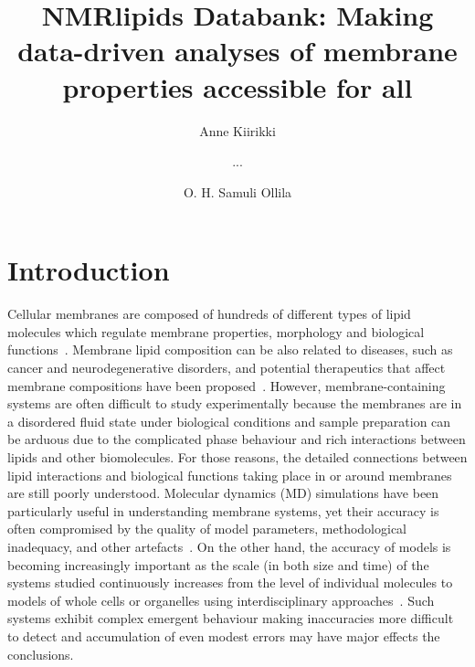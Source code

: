 \documentclass[fleqn,10pt]{wlscirep}
\title{NMRlipids Databank: Making data-driven analyses of membrane properties accessible for all}
\author[1]{Anne Kiirikki}
\author[2]{...}
\author[1,*]{O. H. Samuli Ollila}
\affil[1]{University of Helsinki, Institute of Biotechonology, Helsinki, Finland}
\affil[2]{Affiliation, department, city, postcode, country}
\affil[*]{samuli.ollila@helsinki.fi}
\begin{document}
\flushbottom
\maketitle
%
%
\thispagestyle{empty}


\section{Introduction}


Cellular membranes are composed of hundreds of different types of lipid molecules which regulate membrane properties, morphology and biological functions~\cite{vanmeer08}. Membrane lipid composition can be also related to diseases, such as cancer and neurodegenerative disorders, and potential therapeutics that affect membrane compositions have been proposed~\cite{torres21}. However, membrane-containing systems are often difficult to study experimentally because the membranes are in a disordered fluid state under biological conditions and sample preparation can be arduous due to the complicated phase behaviour and rich interactions between lipids and other biomolecules. For those reasons, the detailed connections between lipid interactions and biological functions taking place in or around membranes are still poorly understood.
Molecular dynamics (MD) simulations have been particularly useful in understanding membrane systems, yet their accuracy is often compromised by the quality of model parameters, methodological inadequacy, and other artefacts~\cite{antila22b,gupta22}. 
On the  other hand, the accuracy of models is becoming increasingly important as the scale (in both size and time) of the systems studied continuously increases 
from the level of individual molecules to models of whole cells or organelles using interdisciplinary approaches~\cite{johnson15,thornburg22,gupta22}. Such systems exhibit complex emergent behaviour making inaccuracies more difficult to detect and accumulation of even modest errors may have major effects the conclusions.
\end{document}
